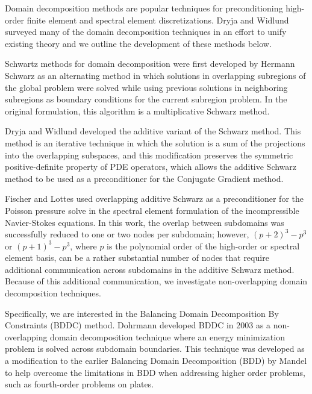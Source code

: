 Domain decomposition methods are popular techniques for preconditioning high-order finite element and spectral element discretizations.
Dryja and Widlund surveyed many of the domain decomposition techniques in an effort to unify existing theory \cite{dryja1989towards} and we outline the development of these methods below.

Schwartz methods for domain decomposition were first developed by Hermann Schwarz \cite{schwarz1972gesammelte} as an alternating method in which solutions in overlapping subregions of the global problem were solved while using previous solutions in neighboring subregions as boundary conditions for the current subregion problem.
In the original formulation, this algorithm is a multiplicative Schwarz method.

Dryja and Widlund \cite{widlund1987additive,dryja1989additive} developed the additive variant of the Schwarz method.
This method is an iterative technique in which the solution is a sum of the projections into the overlapping subspaces, and this modification preserves the symmetric positive-definite property of PDE operators, which allows the additive Schwarz method to be used as a preconditioner for the Conjugate Gradient method.

Fischer and Lottes \cite{fischer1997overlapping,fischer2005hybrid} used overlapping additive Schwarz as a preconditioner for the Poisson pressure solve in the spectral element formulation of the incompressible Navier-Stokes equations.
In this work, the overlap between subdomains was successfully reduced to one or two nodes per subdomain; however, $\left( p + 2 \right)^3 - p^3$ or $\left( p + 1 \right)^3 - p^3$, where $p$ is the polynomial order of the high-order or spectral element basis, can be a rather substantial number of nodes that require additional communication across subdomains in the additive Schwarz method.
Because of this additional communication, we investigate non-overlapping domain decomposition techniques.

Specifically, we are interested in the Balancing Domain Decomposition By Constraints (BDDC) method.
Dohrmann \cite{dohrmann2003preconditioner} developed BDDC in 2003 as a non-overlapping domain decomposition technique where an energy minimization problem is solved across subdomain boundaries.
This technique was developed as a modification to the earlier Balancing Domain Decomposition (BDD) by Mandel \cite{mandel1993balancing} to help overcome the limitations in BDD when addressing higher order problems, such as fourth-order problems on plates.

